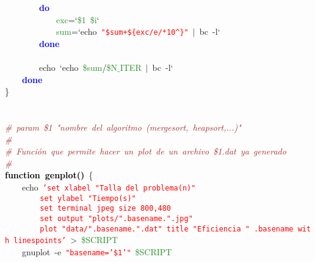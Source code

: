 \mbox{}\ \ \ \ \ \ \ \ \textbf{\textcolor{Blue}{do}} \\
\mbox{}\ \ \ \ \ \ \ \ \ \ \ \ \textcolor{ForestGreen}{exc}\textcolor{BrickRed}{=}`\textcolor{ForestGreen}{\$1}\ \textcolor{ForestGreen}{\$i}` \\
\mbox{}\ \ \ \ \ \ \ \ \ \ \ \ \textcolor{ForestGreen}{sum}\textcolor{BrickRed}{=}`echo\ \texttt{\textcolor{Red}{"{}\$sum+\$\{exc/e/*10\textasciicircum{}\}"{}}}\ \textcolor{BrickRed}{$|$}\ bc\ -l` \\
\mbox{}\ \ \ \ \ \ \ \ \textbf{\textcolor{Blue}{done}} \\
\mbox{}\ \ \ \ \ \ \ \  \\
\mbox{}\ \ \ \ \ \ \ \ echo\ `echo\ \textcolor{ForestGreen}{\$sum}\textcolor{BrickRed}{/}\textcolor{ForestGreen}{\$N$\_$ITER}\ \textcolor{BrickRed}{$|$}\ bc\ -l` \\
\mbox{}\ \ \ \ \textbf{\textcolor{Blue}{done}} \\
\mbox{}\} \\
\mbox{} \\
\mbox{} \\
\mbox{}\textit{\textcolor{Brown}{\#\ param\ \$1\ "{}nombre\ del\ algoritmo\ (mergesort,\ heapsort,...)"{}}} \\
\mbox{}\textit{\textcolor{Brown}{\#}} \\
\mbox{}\textit{\textcolor{Brown}{\#\ Función\ que\ permite\ hacer\ un\ plot\ de\ un\ archivo\ \$1.dat\ ya\ generado}} \\
\mbox{}\textit{\textcolor{Brown}{\#}} \\
\mbox{}\textbf{\textcolor{Black}{function\ genplot()}}\ \{ \\
\mbox{}\ \ \ \ echo\ \texttt{\textcolor{Red}{'set\ xlabel\ "{}Talla\ del\ problema(n)"{}}} \\
\mbox{}\texttt{\textcolor{Red}{\ \ \ \ \ \ \ \ set\ ylabel\ "{}Tiempo(s)"{}}} \\
\mbox{}\texttt{\textcolor{Red}{\ \ \ \ \ \ \ \ set\ terminal\ jpeg\ size\ 800,480}} \\
\mbox{}\texttt{\textcolor{Red}{\ \ \ \ \ \ \ \ set\ output\ "{}plots/"{}.basename."{}.jpg"{}}} \\
\mbox{}\texttt{\textcolor{Red}{\ \ \ \ \ \ \ \ plot\ "{}data/"{}.basename."{}.dat"{}\ title\ "{}Eficiencia\ "{}\ .basename\ with\ linespoints'}}\ \textcolor{BrickRed}{\textgreater{}}\ \textcolor{ForestGreen}{\$SCRIPT} \\
\mbox{}\ \ \ \ gnuplot\ -e\ \texttt{\textcolor{Red}{"{}basename='\$1'"{}}}\ \textcolor{ForestGreen}{\$SCRIPT} \\
